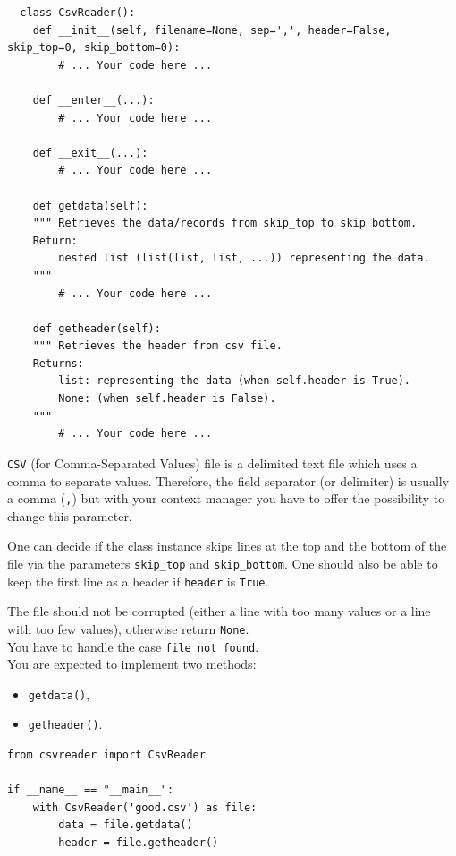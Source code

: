 \documentclass{42-en}
\begin{document}
\begin{verbatim}
  class CsvReader():
	def __init__(self, filename=None, sep=',', header=False, skip_top=0, skip_bottom=0):
		# ... Your code here ...

	def __enter__(...):
		# ... Your code here ...
	
	def __exit__(...):
		# ... Your code here ...
	
	def getdata(self):
	""" Retrieves the data/records from skip_top to skip bottom.
	Return:
		nested list (list(list, list, ...)) representing the data.
	"""
		# ... Your code here ...

	def getheader(self):
	""" Retrieves the header from csv file.
	Returns:
		list: representing the data (when self.header is True).
        None: (when self.header is False).
	"""
		# ... Your code here ...
\end{verbatim}

\texttt{CSV} (for Comma-Separated Values) file is a delimited text file which uses a comma to separate values.
Therefore, the field separator (or delimiter) is usually a comma (\texttt{,})
but with your context manager you have to offer the possibility to change this parameter.


One can decide if the class instance skips lines at the top and the bottom of the file via the
parameters \texttt{skip\_top} and \texttt{skip\_bottom}.
One should also be able to keep the first line as a header if \texttt{header} is \texttt{True}.


The file should not be corrupted (either a line with too many values or a line
with too few values), otherwise return \texttt{None}.\\
You have to handle the case \texttt{file not found}.\\


You are expected to implement two methods:
\begin{itemize}
  \item \texttt{getdata()},
  \item \texttt{getheader()}.
\end{itemize}

\begin{verbatim}
from csvreader import CsvReader

if __name__ == "__main__":
	with CsvReader('good.csv') as file:
		data = file.getdata()
		header = file.getheader()
\end{verbatim}
\end{document}
